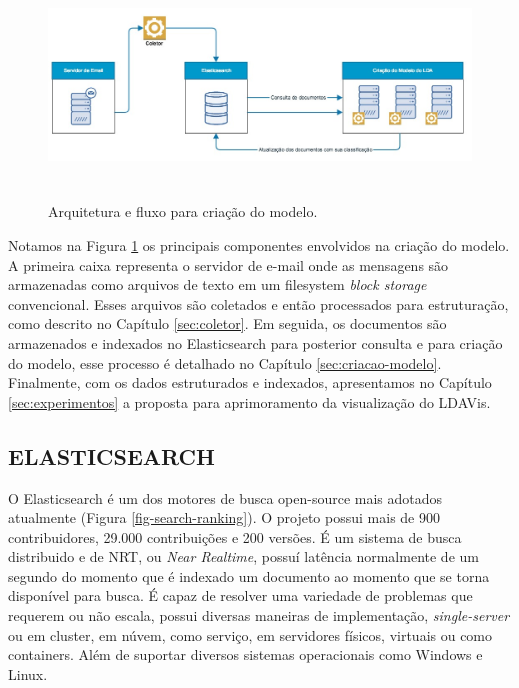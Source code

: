 \documentclass[12pt,a4paper]{article}
\begin{document}
\begin{figure}[H]
	\centering
  \includegraphics[height=6cm]{images/figure_11.jpg}
  \caption{Arquitetura e fluxo para criação do modelo.}
  \label{fig-framework-lda}
\end{figure}

Notamos na Figura \ref{fig-framework-lda} os principais componentes envolvidos na criação do modelo. A primeira caixa representa o servidor de 
 e-mail onde as mensagens são armazenadas como arquivos de texto em um filesystem \textit{block storage} convencional. Esses arquivos são coletados e então
 processados para estruturação, como descrito no Capítulo \ref{sec:coletor}. Em seguida, os documentos são armazenados e indexados no Elasticsearch para
 posterior consulta e para criação do modelo, esse processo é detalhado no Capítulo \ref{sec:criacao-modelo}. Finalmente, com os dados estruturados
 e indexados, apresentamos no Capítulo \ref{sec:experimentos} a proposta para aprimoramento da visualização do LDAVis.

\subsection{ELASTICSEARCH} \label{sec:elasticsearch}

O Elasticsearch é um dos motores de busca open-source mais adotados atualmente (Figura \ref{fig-search-ranking}). 
 O projeto possui mais de 900 contribuidores, 29.000
 contribuições e 200 versões. É um sistema de busca distribuido  e de NRT, ou \textit{Near Realtime}, possuí latência normalmente de um segundo
 do momento que é indexado um documento ao momento que se torna disponível para busca. É capaz de resolver uma variedade de problemas que requerem ou não escala,
 possui diversas maneiras de implementação, \textit{single-server} ou em cluster, em núvem, como serviço, em servidores físicos, virtuais ou como containers.
 Além de suportar diversos sistemas operacionais como Windows e Linux.
\end{document}
